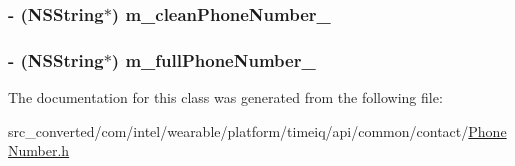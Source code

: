 \subsubsection[{m\+\_\+clean\+Phone\+Number\+\_\+}]{\setlength{\rightskip}{0pt plus 5cm}-\/ (N\+S\+String$\ast$) m\+\_\+clean\+Phone\+Number\+\_\+}\label{interface_phone_number_a0f3de84a42cdb2b19b7ad383c289ed19}
\hypertarget{interface_phone_number_a3f838d181b37c2f014a59f4922646da0}{}
\subsubsection[{m\+\_\+full\+Phone\+Number\+\_\+}]{\setlength{\rightskip}{0pt plus 5cm}-\/ (N\+S\+String$\ast$) m\+\_\+full\+Phone\+Number\+\_\+}\label{interface_phone_number_a3f838d181b37c2f014a59f4922646da0}


The documentation for this class was generated from the following file\+:\begin{DoxyCompactItemize}
\item 
src\+\_\+converted/com/intel/wearable/platform/timeiq/api/common/contact/\hyperlink{_phone_number_8h}{Phone\+Number.\+h}\end{DoxyCompactItemize}
